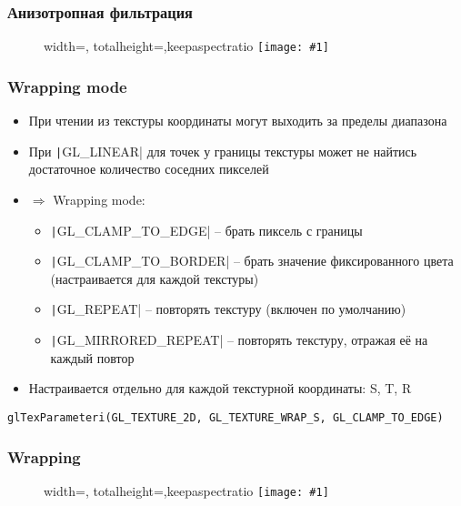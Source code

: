 \documentclass[10pt]{beamer}
\newcommand{\slideimage}[1]{
  \begin{figure}
    \begin{adjustbox}{width=\textwidth, totalheight=\textheight-2\baselineskip-2\baselineskip,keepaspectratio}
      \texttt{[image: \#1]}
    \end{adjustbox}
  \end{figure}
}
\begin{document}
\begin{frame}
\frametitle{Анизотропная фильтрация}
\slideimage{anisotropy.png}
\end{frame}

\begin{frame}[fragile]
\frametitle{Wrapping mode}
\begin{itemize}
\item При чтении из текстуры координаты могут выходить за пределы диапазона
\pause
\item При \texttt|GL_LINEAR| для точек у границы текстуры может не найтись достаточное количество соседних пикселей
\pause
\item \begin{math}\Longrightarrow\end{math} Wrapping mode:
\begin{itemize}
\item \texttt|GL_CLAMP_TO_EDGE| -- брать пиксель с границы
\item \texttt|GL_CLAMP_TO_BORDER| -- брать значение фиксированного цвета (настраивается для каждой текстуры)
\item \texttt|GL_REPEAT| -- повторять текстуру (включен по умолчанию)
\item \texttt|GL_MIRRORED_REPEAT| -- повторять текстуру, отражая её на каждый повтор
\end{itemize}
\pause
\item Настраивается отдельно для каждой текстурной координаты: S, T, R
\end{itemize}
\begin{verbatim}
glTexParameteri(GL_TEXTURE_2D, GL_TEXTURE_WRAP_S, GL_CLAMP_TO_EDGE)
\end{verbatim}
\end{frame}

\begin{frame}
\frametitle{Wrapping}
\slideimage{wrapping.png}
\end{frame}
\end{document}
